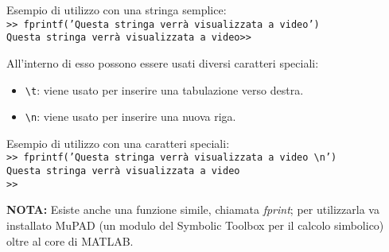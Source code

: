 Esempio di utilizzo con una stringa semplice: \\
\texttt{>> fprintf('Questa stringa verrà visualizzata a video')} \\
\texttt{Questa stringa verrà visualizzata a video>>}
\break
			
All'interno di esso possono essere usati diversi caratteri speciali:
\begin{itemize}
	\item	\texttt{\textbackslash t}: viene usato per inserire una tabulazione verso destra.
	\item	\texttt{\textbackslash n}: viene usato per inserire una nuova riga.
\end{itemize}

Esempio di utilizzo con una caratteri speciali: \\
\texttt{>> fprintf('Questa stringa verrà visualizzata a video \textbackslash n')} \\
\texttt{Questa stringa verrà visualizzata a video} \\
\texttt{>>}
\break

\textbf{NOTA:} Esiste anche una funzione simile, chiamata \textit{fprint}; per utilizzarla va installato MuPAD (un 
modulo del Symbolic Toolbox per il calcolo simbolico) oltre al core di MATLAB.

